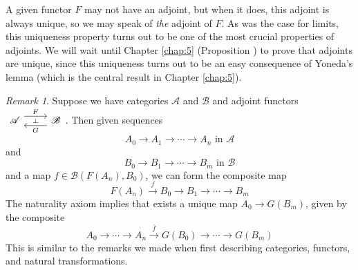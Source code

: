 \documentclass[10pt,oneside]{book}
\def\~#1{\mathscr{#1}}
\def\To#1{\xrightarrow{#1}}
\theoremstyle{plain}
\theoremstyle{definition}
\theoremstyle{remark}
\newtheorem*{rmk}{Remark}
\numberwithin{equation}{section}
\numberwithin{figure}{section}
\begin{document}
A given functor $F$ may not have an adjoint, but when it does, this adjoint is always unique, so we may speak of \emph{the} adjoint of $F$. As was the case for limits, this uniqueness property turns out to be one of the most crucial properties of adjoints. We will wait until Chapter \ref{chap:5} (Proposition ) to prove that adjoints are unique, since this uniqueness turns out to be an easy consequence of Yoneda's lemma (which is the central result in Chapter \ref{chap:5}).

\begin{rmk}
    Suppose we have categories $\~A$ and $\~B$ and adjoint functors $\begin{tikzcd}
    {\~A} & {\~B}
    \arrow[""{name=0, anchor=center, inner sep=0}, "F", shift left=2, from=1-1, to=1-2]
    \arrow[""{name=1, anchor=center, inner sep=0}, "G", shift left=2, from=1-2, to=1-1]
    \arrow["\dashv"{anchor=center, rotate=-90}, draw=none, from=0, to=1]
\end{tikzcd}$. Then given sequences 
\[A_0 \to A_1 \to \cdots \to A_n  \text{ in } \~A \]
and
\[B_0 \to B_1 \to \cdots \to B_m \text{ in } \~B\]
and a map $f \in \~B(F(A_n), B_0)$, we can form the composite map
\[F(A_n) \To{f} B_0 \to B_1 \to \cdots \to B_m\]
The naturality axiom implies that exists a unique map $A_0 \to G(B_m)$, given by the composite 
\[A_0 \to \cdots \to A_n \To{\bar{f}} G(B_0) \to \cdots \to G(B_m)\]
This is similar to the remarks we made when first describing categories, functors, and natural transformations.
\end{rmk}
\end{document}
